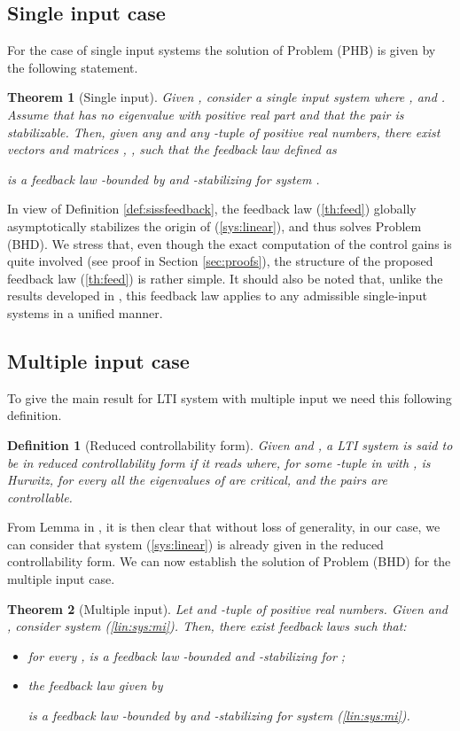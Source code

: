 \documentclass[letterpaper, 10pt]{article}
\newtheorem{theo}{Theorem}
\newtheorem{defi}{Definition}
\newcommand{\rref}[1]{(\ref{#1})}
\begin{document}
\subsection{Single input case}

For the case of single input systems the solution of Problem (PHB) is given by the following statement.

\begin{theo}[Single input]
\label{th:main}
Given , consider a single input system  where ,  and . Assume that  has no eigenvalue with positive real part and that the pair  is stabilizable. Then, given any  and any -tuple  of positive real numbers, there exist vectors  and matrices , , such that the feedback law  defined as
 
is a feedback law -bounded by  and -stabilizing for system .
\end{theo} 

In view of Definition \ref{def:sissfeedback}, the feedback law \rref{th:feed} globally asymptotically stabilizes the origin of \rref{sys:linear}, and thus solves Problem (BHD). We stress that, even though the exact computation of the control gains  is quite involved (see proof in Section \ref{sec:proofs}), the structure of the proposed feedback law \rref{th:feed} is rather simple. It should also be noted that, unlike the results developed in \cite{LCC1}, this feedback law applies to any admissible single-input systems in a unified manner.



\subsection{Multiple input case}
To give the main result for LTI system with multiple input we need this following definition.
\begin{defi}[Reduced controllability form]
Given  and , a LTI system is said to be in \emph{reduced controllability form} if it reads
 where, for some -tuple  in  with ,  is Hurwitz, for every  all the eigenvalues of  are critical,  and the pairs  are controllable. 
\end{defi}
From Lemma  in \cite{SSY}, it is then clear that without loss of generality, in our case, we can consider that system \rref{sys:linear}  is already given in the reduced controllability form. We can now establish the solution of Problem (BHD) for the multiple input case.

\begin{theo}[Multiple input]
\label{th:mi}
Let  and -tuple  of positive real numbers. Given  and , consider system \rref{lin:sys:mi}. Then, there exist  feedback laws  such that:
\begin{itemize}
\item[i)] for every ,  is a feedback law -bounded and -stabilizing for ;
\item[ii)] the feedback law  given by 
 
is a feedback law -bounded by  and -stabilizing for system \rref{lin:sys:mi}.
\end{itemize}
\end{theo}
\end{document}
